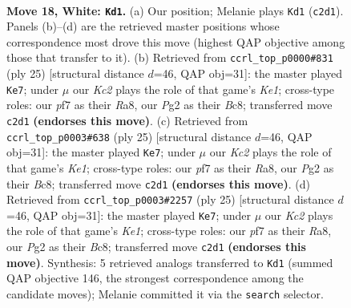 \documentclass[11pt]{article}
\begin{document}
\clearpage

\begin{figure}[p]\centering
\begin{subfigure}{0.46\textwidth}\centering
\resizebox{\linewidth}{!}{%
\newchessgame
\chessboard[
  setfen={r1b1kb1r/5p2/4p3/pp1pn1Pp/8/6N1/PPK3PP/R1B3NR w kq - 0 18},
  showmover=false,
  pgfstyle=straightmove, color=movearrow, markmove={c2-d1}
]}
\caption{}
\end{subfigure}\hfill
\begin{subfigure}{0.46\textwidth}\centering
\resizebox{\linewidth}{!}{%
\newchessgame
\chessboard[
  setfen={r1b1k2r/pp1n1ppp/4p3/3pP3/3N1P2/8/PPP3PP/R3KB1R b KQkq - 0 13},
  showmover=false,
  pgfstyle=straightmove, color=movearrow, markmove={e8-e7}
]}
\caption{}
\end{subfigure}
\\[4pt]
\begin{subfigure}{0.46\textwidth}\centering
\resizebox{\linewidth}{!}{%
\newchessgame
\chessboard[
  setfen={r1b1k2r/pp1n1ppp/4p3/3pP3/3N1P2/8/PPP3PP/R3KB1R b KQkq - 0 13},
  showmover=false,
  pgfstyle=straightmove, color=movearrow, markmove={e8-e7}
]}
\caption{}
\end{subfigure}\hfill
\begin{subfigure}{0.46\textwidth}\centering
\resizebox{\linewidth}{!}{%
\newchessgame
\chessboard[
  setfen={r1b1k2r/pp1n1ppp/4p3/3pP3/3N1P2/8/PPP3PP/R3KB1R b KQkq - 0 13},
  showmover=false,
  pgfstyle=straightmove, color=movearrow, markmove={e8-e7}
]}
\caption{}
\end{subfigure}
\caption{\textbf{Move 18, White: \texttt{Kd1}.} (a) Our position; Melanie plays \texttt{Kd1} (\texttt{c2d1}). Panels (b)--(d) are the retrieved master positions whose correspondence most drove this move (highest QAP objective among those that transfer to it). (b) Retrieved from \texttt{ccrl\_top\_p0000\#831} (ply 25) [structural distance $d$=46, QAP obj=31]: the master played \texttt{Ke7}; under $\mu$ our \emph{Kc2} plays the role of that game's \emph{Ke1}; cross-type roles: our \emph{p}f7 as their \emph{R}a8, our \emph{P}g2 as their \emph{B}c8; transferred move \texttt{c2d1} \textbf{(endorses this move)}. (c) Retrieved from \texttt{ccrl\_top\_p0003\#638} (ply 25) [structural distance $d$=46, QAP obj=31]: the master played \texttt{Ke7}; under $\mu$ our \emph{Kc2} plays the role of that game's \emph{Ke1}; cross-type roles: our \emph{p}f7 as their \emph{R}a8, our \emph{P}g2 as their \emph{B}c8; transferred move \texttt{c2d1} \textbf{(endorses this move)}. (d) Retrieved from \texttt{ccrl\_top\_p0003\#2257} (ply 25) [structural distance $d$=46, QAP obj=31]: the master played \texttt{Ke7}; under $\mu$ our \emph{Kc2} plays the role of that game's \emph{Ke1}; cross-type roles: our \emph{p}f7 as their \emph{R}a8, our \emph{P}g2 as their \emph{B}c8; transferred move \texttt{c2d1} \textbf{(endorses this move)}. Synthesis: 5 retrieved analogs transferred to \texttt{Kd1} (summed QAP objective 146, the strongest correspondence among the candidate moves); Melanie committed it via the \texttt{search} selector.}
\label{fig:thought-m34}
\end{figure}
\end{document}
